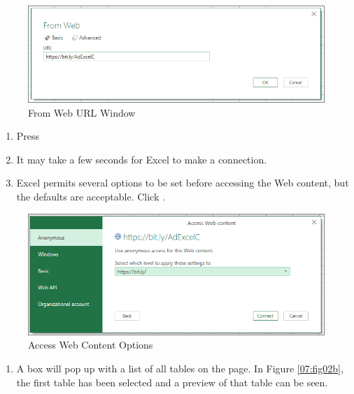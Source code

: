 \begin{figure}[H]
	\centering
	\includegraphics[width=\maxwidth{.95\linewidth}]{gfx/ch07_fig02a}
	\caption{From Web URL Window}
	\label{07:fig02a}
\end{figure}
	
\begin{enumerate}[resume]
	\item Press 
	\item It may take a few seconds for Excel to make a connection.
	\item Excel permits several options to be set before accessing the Web content, but the defaults are acceptable. Click .
\end{enumerate}

\begin{figure}[H]
	\centering
	\includegraphics[width=\maxwidth{.95\linewidth}]{gfx/ch07_fig02g}
	\caption{Access Web Content Options}
	\label{07:fig02g}
\end{figure}
	
\begin{enumerate}[resume]
	\item A box will pop up with a list of all tables on the page. In Figure \ref{07:fig02b}, the first table has been selected and a preview of that table can be seen.
\end{enumerate}

